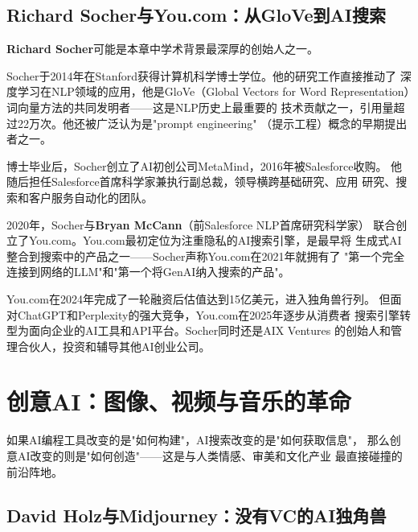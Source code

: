 \subsection{Richard Socher与You.com：从GloVe到AI搜索}
\label{subsec:founders-youcom}

\textbf{Richard Socher}可能是本章中学术背景最深厚的创始人之一。

Socher于2014年在Stanford获得计算机科学博士学位。他的研究工作直接推动了
深度学习在NLP领域的应用，他是GloVe（Global Vectors for Word
Representation）词向量方法的共同发明者——这是NLP历史上最重要的
技术贡献之一，引用量超过22万次。他还被广泛认为是"prompt engineering"
（提示工程）概念的早期提出者之一。

博士毕业后，Socher创立了AI初创公司MetaMind，2016年被Salesforce收购。
他随后担任Salesforce首席科学家兼执行副总裁，领导横跨基础研究、应用
研究、搜索和客户服务自动化的团队。

2020年，Socher与\textbf{Bryan McCann}（前Salesforce NLP首席研究科学家）
联合创立了You.com。You.com最初定位为注重隐私的AI搜索引擎，是最早将
生成式AI整合到搜索中的产品之一——Socher声称You.com在2021年就拥有了
"第一个完全连接到网络的LLM"和"第一个将GenAI纳入搜索的产品"。

You.com在2024年完成了一轮融资后估值达到15亿美元，进入独角兽行列。
但面对ChatGPT和Perplexity的强大竞争，You.com在2025年逐步从消费者
搜索引擎转型为面向企业的AI工具和API平台。Socher同时还是AIX Ventures
的创始人和管理合伙人，投资和辅导其他AI创业公司。


\section{创意AI：图像、视频与音乐的革命}
\label{sec:founders-creative}

如果AI编程工具改变的是"如何构建"，AI搜索改变的是"如何获取信息"，
那么创意AI改变的则是"如何创造"——这是与人类情感、审美和文化产业
最直接碰撞的前沿阵地。

\subsection{David Holz与Midjourney：没有VC的AI独角兽}
\label{subsec:founders-midjourney}

